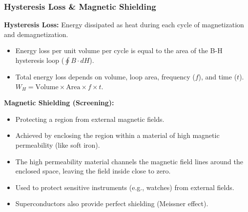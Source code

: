 \transfade[duration=0.5]

\begin{frame}[t]
    \frametitle{\textcolor{deepnavy}{\textbf{Hysteresis Loss & Magnetic Shielding}}}
    \renewcommand{\familydefault}{\rmdefault}
    \small

      \item<+-> \textbf{Hysteresis Loss:} Energy dissipated as heat during each cycle of magnetization and demagnetization.
        \begin{itemize}[<+->]
              \item Energy loss per unit volume per cycle is equal to the area of the B-H hysteresis loop ($\oint B \cdot dH$).
              \item Total energy loss depends on volume, loop area, frequency ($f$), and time ($t$). $W_H = \text{Volume} \times \text{Area} \times f \times t$.
        \end{itemize}

    \vspace{1em}

      \item<+-> \textbf{Magnetic Shielding (Screening):}
        \begin{itemize}[<+->]
              \item Protecting a region from external magnetic fields.
              \item Achieved by enclosing the region within a material of high magnetic permeability (like soft iron).
              \item The high permeability material channels the magnetic field lines around the enclosed space, leaving the field inside close to zero. %
              \item Used to protect sensitive instruments (e.g., watches) from external fields.
              \item Superconductors also provide perfect shielding (Meissner effect).
        \end{itemize}
\end{frame}

\transfade[duration=0.5]

